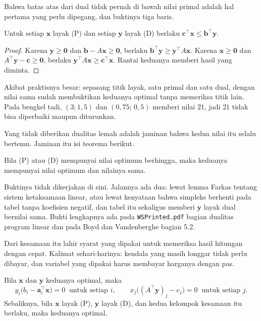Bahwa batas atas dari dual tidak pernah di bawah nilai primal adalah hal pertama yang perlu
dipegang, dan buktinya tiga baris.

\begin{teorema}
Untuk setiap $\mathbf{x}$ layak (P) dan setiap $\mathbf{y}$ layak (D) berlaku
$\mathbf{c}^{\top}\mathbf{x}\le\mathbf{b}^{\top}\mathbf{y}$.
\end{teorema}

\begin{proof}
Karena $\mathbf{y}\ge\mathbf{0}$ dan $\mathbf{b}-A\mathbf{x}\ge\mathbf{0}$, berlaku
$\mathbf{b}^{\top}\mathbf{y}\ge\mathbf{y}^{\top}A\mathbf{x}$. Karena
$\mathbf{x}\ge\mathbf{0}$ dan $A^{\top}\mathbf{y}-\mathbf{c}\ge\mathbf{0}$, berlaku
$\mathbf{y}^{\top}A\mathbf{x}\ge\mathbf{c}^{\top}\mathbf{x}$. Rantai keduanya memberi
hasil yang diminta.
\end{proof}

Akibat praktisnya besar: sepasang titik layak, satu primal dan satu dual, dengan nilai sama
sudah membuktikan keduanya optimal tanpa memeriksa titik lain. Pada bengkel tadi,
$(3;1{,}5)$ dan $(0{,}75;\,0{,}5)$ memberi nilai $21$, jadi $21$ tidak bisa diperbaiki
maupun diturunkan.

Yang tidak diberikan dualitas lemah adalah jaminan bahwa kedua nilai itu selalu bertemu.
Jaminan itu isi teorema berikut.

\begin{teorema}
Bila (P) atau (D) mempunyai nilai optimum berhingga, maka keduanya mempunyai nilai optimum
dan nilainya sama.
\end{teorema}

Buktinya tidak dikerjakan di sini. Jalannya ada dua: lewat lemma Farkas tentang sistem
ketaksamaan linear, atau lewat kenyataan bahwa simpleks berhenti pada tabel tanpa koefisien
negatif, dan tabel itu sekaligus memberi $\mathbf{y}$ layak dual bernilai sama. Bukti
lengkapnya ada pada \texttt{WSPrinted.pdf} bagian dualitas program linear dan pada Boyd dan
Vandenberghe bagian 5.2.

Dari kesamaan itu lahir syarat yang dipakai untuk memeriksa hasil hitungan dengan cepat.
Kalimat sehari-harinya: kendala yang masih longgar tidak perlu dibayar, dan variabel yang
dipakai harus membayar harganya dengan pas.

\begin{akibat}
Bila $\mathbf{x}$ dan $\mathbf{y}$ keduanya optimal, maka
\[
  y_{i}\bigl(b_{i}-\mathbf{a}_{i}^{\top}\mathbf{x}\bigr)=0 \ \text{ untuk setiap } i,
  \qquad
  x_{j}\bigl((A^{\top}\mathbf{y})_{j}-c_{j}\bigr)=0 \ \text{ untuk setiap } j .
\]
Sebaliknya, bila $\mathbf{x}$ layak (P), $\mathbf{y}$ layak (D), dan kedua kelompok
kesamaan itu berlaku, maka keduanya optimal.
\end{akibat}

